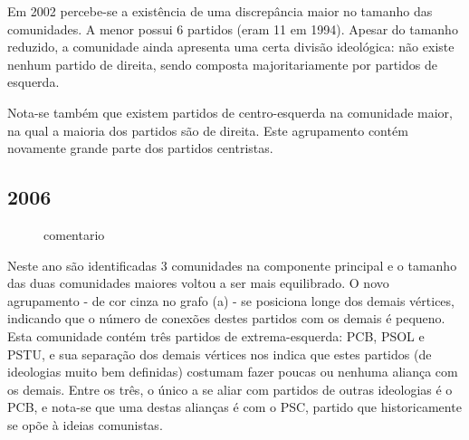 Em 2002 percebe-se a existência de uma discrepância maior no tamanho das comunidades. A menor possui 6 partidos (eram 11 em 1994). Apesar do tamanho reduzido, a comunidade ainda apresenta uma certa divisão ideológica: não existe nenhum partido de direita, sendo composta majoritariamente por partidos de esquerda.

Nota-se também que existem partidos de centro-esquerda na comunidade maior, na qual a maioria dos partidos são de direita. Este agrupamento contém novamente grande parte dos partidos centristas.

\subsection{2006}
\label{resultados__grafos--2006}

\begin{figure}[H]
\center
    \qquad

    \caption{comentario}
\end{figure}

Neste ano são identificadas 3 comunidades na componente principal e o tamanho das duas comunidades maiores voltou a ser mais equilibrado. O novo agrupamento - de cor cinza no grafo (a) - se posiciona longe dos demais vértices, indicando que o número de conexões destes partidos com  os demais é pequeno. Esta comunidade contém três partidos de extrema-esquerda: \gls{PCB}, \gls{PSOL} e \gls{PSTU}, e sua separação dos demais vértices nos indica que estes partidos (de ideologias muito bem definidas) costumam fazer poucas ou nenhuma aliança com os demais. Entre os três, o único a se aliar com partidos de outras ideologias é o \gls{PCB}, e nota-se que uma destas alianças é com o \gls{PSC}, partido que historicamente se opõe à ideias comunistas.

